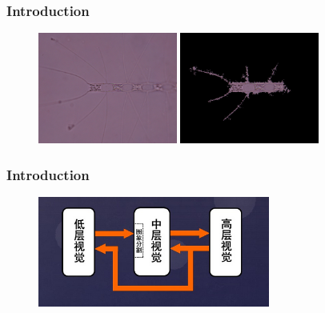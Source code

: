 \documentclass[notheorems,mathserif,table,compress]{beamer}  %
\begin{document}
\begin{frame}
\frametitle{Introduction}
   \begin{figure}[!ht]
   \begin{minipage}[t]{0.4\textwidth}
   \centering
   \includegraphics[width=1.8in]{algea.jpg}
   \end{minipage}
   \begin{minipage}[t]{0.4\textwidth}
   \centering
   \includegraphics[width=1.8in]{algea2.jpg}
   \end{minipage} 
   \end{figure} 
\end{frame}

\begin{frame}
    \frametitle{Introduction}
    \begin{figure}[!ht]
    \centering
    \includegraphics[width=3.0in]{path.png}
    \end{figure} 
\end{frame}
\end{document}
